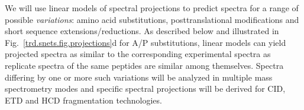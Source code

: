 \documentclass[arial,11pt]{article}
\begin{document}
%
%
We will use linear models of spectral projections to predict spectra for a range of possible {\em variations}: amino acid substitutions, posttranslational modifications and short sequence extensions/reductions.
%
As described below and illustrated in Fig.~\ref{trd.snets.fig.projections}d for A/P substitutions, linear models can yield projected spectra as similar to the corresponding experimental spectra as replicate spectra of the same peptides are similar among themselves.
%
Spectra differing by one or more such variations will be analyzed in multiple mass spectrometry modes and specific spectral projections will be derived for CID, ETD and HCD fragmentation technologies. %

\end{document}
